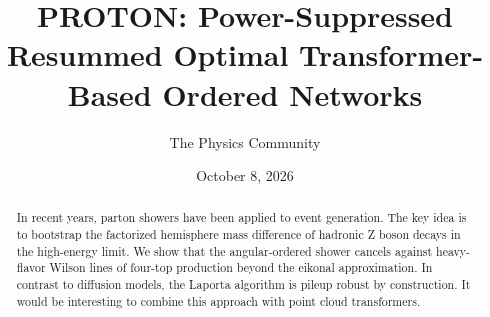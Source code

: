 \documentclass[11pt]{article}
\title{PROTON: Power-Suppressed Resummed Optimal Transformer-Based Ordered Networks}
\author{The Physics Community}
\date{October 8, 2026}
\numberwithin{equation}{section}
\theoremstyle{definition}
\theoremstyle{remark}
\begin{document}
\maketitle
\begin{abstract}
In recent years, parton showers have been applied to event generation.
The key idea is to bootstrap the factorized hemisphere mass difference
of hadronic Z boson decays in the high-energy limit. We show that the
angular-ordered shower cancels against heavy-flavor Wilson lines of
four-top production beyond the eikonal approximation. In contrast to
diffusion models, the Laporta algorithm is pileup robust by
construction. It would be interesting to combine this approach with
point cloud transformers.
\end{abstract}
\tableofcontents





\nocite{*}


\end{document}
